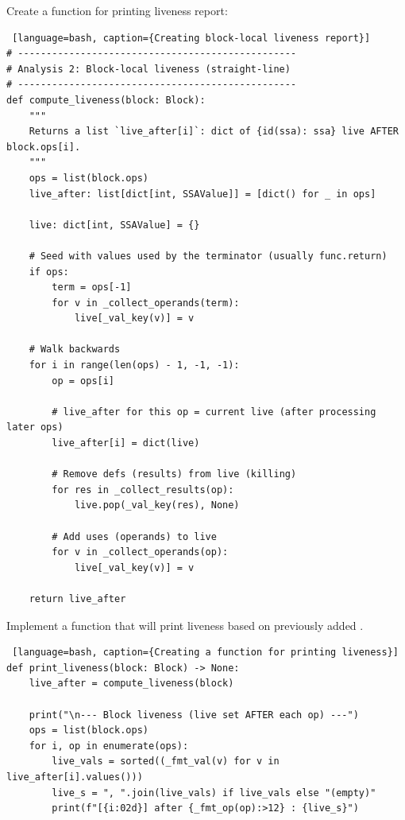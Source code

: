 \documentclass[../main.tex]{subfiles}
\begin{document}
Create a function for printing liveness report:
\begin{lstlisting} [language=bash, caption={Creating block-local liveness report}]
# -------------------------------------------------
# Analysis 2: Block-local liveness (straight-line)
# -------------------------------------------------
def compute_liveness(block: Block):
    """
    Returns a list `live_after[i]`: dict of {id(ssa): ssa} live AFTER block.ops[i].
    """
    ops = list(block.ops)
    live_after: list[dict[int, SSAValue]] = [dict() for _ in ops]

    live: dict[int, SSAValue] = {}

    # Seed with values used by the terminator (usually func.return)
    if ops:
        term = ops[-1]
        for v in _collect_operands(term):
            live[_val_key(v)] = v

    # Walk backwards
    for i in range(len(ops) - 1, -1, -1):
        op = ops[i]

        # live_after for this op = current live (after processing later ops)
        live_after[i] = dict(live)

        # Remove defs (results) from live (killing)
        for res in _collect_results(op):
            live.pop(_val_key(res), None)

        # Add uses (operands) to live
        for v in _collect_operands(op):
            live[_val_key(v)] = v

    return live_after
\end{lstlisting}

Implement a function that will print liveness based on previously added .
\begin{lstlisting} [language=bash, caption={Creating a function for printing liveness}]
def print_liveness(block: Block) -> None:
    live_after = compute_liveness(block)

    print("\n--- Block liveness (live set AFTER each op) ---")
    ops = list(block.ops)
    for i, op in enumerate(ops):
        live_vals = sorted((_fmt_val(v) for v in live_after[i].values()))
        live_s = ", ".join(live_vals) if live_vals else "(empty)"
        print(f"[{i:02d}] after {_fmt_op(op):>12} : {live_s}")
\end{lstlisting}
\end{document}
